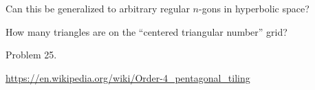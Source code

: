 \documentclass{article}
\begin{document}
  \begin{related}
    \item Can this be generalized to arbitrary regular $n$-gons in hyperbolic
      space?
    \item How many triangles are on the ``centered triangular number'' grid?

  \end{related}
  \begin{references}
    \item Problem 25.
    \item \url{https://en.wikipedia.org/wiki/Order-4_pentagonal_tiling}
  \end{references}
\end{document}

